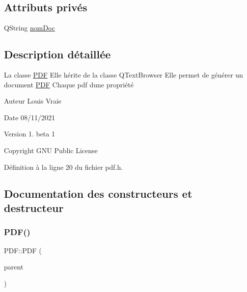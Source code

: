 \subsection*{Attributs privés}
\begin{DoxyCompactItemize}
\item 
Q\+String \hyperlink{class_p_d_f_ab62ed8b5ba6389035dd0aa0455ffd4f2}{nom\+Doc}
\end{DoxyCompactItemize}


\subsection{Description détaillée}
La classe \hyperlink{class_p_d_f}{P\+DF} Elle hérite de la classe Q\+Text\+Browser Elle permet de générer un document \hyperlink{class_p_d_f}{P\+DF} Chaque pdf d\textquotesingle{}une propriété 

\begin{DoxyAuthor}{Auteur}
Louis Vraie 
\end{DoxyAuthor}
\begin{DoxyDate}{Date}
08/11/2021 
\end{DoxyDate}
\begin{DoxyVersion}{Version}
1. beta 1 
\end{DoxyVersion}
\begin{DoxyCopyright}{Copyright}
G\+NU Public License 
\end{DoxyCopyright}


Définition à la ligne 20 du fichier pdf.\+h.



\subsection{Documentation des constructeurs et destructeur}
\mbox{\label{class_p_d_f_af73fdd2d9d2d8aad204895ff5ffd35c4}} 
\subsubsection{\texorpdfstring{P\+D\+F()}{PDF()}}
{\footnotesize\ttfamily P\+D\+F\+::\+P\+DF (\begin{DoxyParamCaption}\item[{Q\+Widget $\ast$}]{parent }\end{DoxyParamCaption})}




